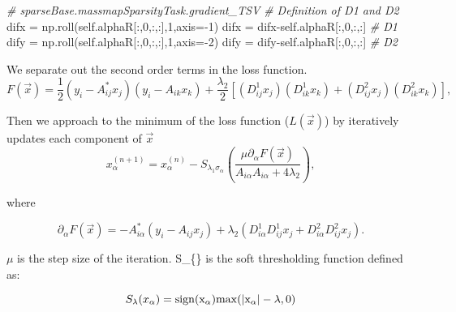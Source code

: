 \documentclass[11pt]{article}
\newenvironment{Shaded}{}{}
\newcommand{\DecValTok}[1]{\textcolor[rgb]{0.25,0.63,0.44}{{#1}}}
\newcommand{\CommentTok}[1]{\textcolor[rgb]{0.38,0.63,0.69}{\textit{{#1}}}}
\newcommand{\NormalTok}[1]{{#1}}
\newcommand{\VariableTok}[1]{\textcolor[rgb]{0.10,0.09,0.49}{{#1}}}
\newcommand{\OperatorTok}[1]{\textcolor[rgb]{0.40,0.40,0.40}{{#1}}}
\begin{document}
\begin{Shaded}
\begin{Highlighting}[]
\CommentTok{# sparseBase.massmapSparsityTask.gradient_TSV}
\CommentTok{# Definition of D1 and D2}
\NormalTok{difx    }\OperatorTok{=}\NormalTok{   np.roll(}\VariableTok{self}\NormalTok{.alphaR[:,}\DecValTok{0}\NormalTok{,:,:],}\DecValTok{1}\NormalTok{,axis}\OperatorTok{=-}\DecValTok{1}\NormalTok{)}
\NormalTok{difx    }\OperatorTok{=}\NormalTok{   difx}\OperatorTok{-}\VariableTok{self}\NormalTok{.alphaR[:,}\DecValTok{0}\NormalTok{,:,:] }\CommentTok{# D1}
\NormalTok{dify    }\OperatorTok{=}\NormalTok{   np.roll(}\VariableTok{self}\NormalTok{.alphaR[:,}\DecValTok{0}\NormalTok{,:,:],}\DecValTok{1}\NormalTok{,axis}\OperatorTok{=-}\DecValTok{2}\NormalTok{)}
\NormalTok{dify    }\OperatorTok{=}\NormalTok{   dify}\OperatorTok{-}\VariableTok{self}\NormalTok{.alphaR[:,}\DecValTok{0}\NormalTok{,:,:] }\CommentTok{# D2}
\end{Highlighting}
\end{Shaded}

    We separate out the second order terms in the loss function.
\[F(\vec{x})=\frac{1}{2}(y_{i}-A^{*}_{ij}x_{j})(y_{i}-A_{ik}x_{k})+\frac{\lambda_2}{2}[(D^{1}_{ij} x_{j})(D^{1}_{ik}x_{k})+ (D^{2}_{ij} x_{j})(D^{2}_{ik}x_{k})],\]

Then we approach to the minimum of the loss function (\(L(\vec{x})\)) by
iteratively updates each component of \(\vec{x}\)
\[x_{\alpha}^{(n+1)}=x_{\alpha}^{(n)}-S_{\lambda_1 \sigma_{\alpha}}(\frac{\mu\partial_{\alpha}F(\vec{x})}{A_{i\alpha}A_{i\alpha}+4\lambda_2}),\]

where

\[\partial_\alpha F(\vec{x})=-A_{i\alpha}^{*} (y_{i}-A_{ij}x_{j}) + \lambda_2(D^1_{i\alpha}D^1_{ij} x_{j}+ D^2_{i\alpha} D^2_{ij} x_j).\]

\(\mu\) is the step size of the iteration. S\_\{\lambda\} is the soft
thresholding function defined as:

\[S_{\lambda} (x_{\alpha})=\rm{sign}(x_{\alpha}) \rm{max}(|x_{\alpha}| - \lambda,0)\]
\end{document}
